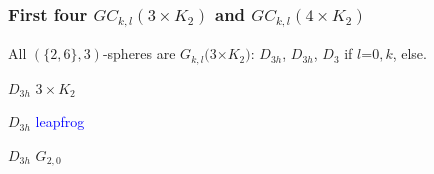 \documentclass{beamer}
\begin{document}
\begin{frame}\frametitle{First four $GC_{k,l}(3\times K_2)$ and   
$GC_{k,l}(4\times 
K_2)$}
\vspace{-2.5mm}
All $(\{2,6\},3)$-spheres are $G_{k,l}(3$$\times$$ K_2)$:  $D_{3h}$, 
$D_{3h}$, $D_3$ if $l$=$0,k$, else.
\begin{center}
\begin{minipage}[b]{25mm}
\centering
{}\par
$D_{3h}$ $3 \times K_2$
\end{minipage}
\begin{minipage}[b]{23mm}
\centering
{}\par
$D_{3h}$ \textcolor{blue}{leapfrog} 
\end{minipage}
\begin{minipage}[b]{18mm}
\centering
{}\par
$D_{3h}$  $G_{2,0}$
\end{minipage} 
\begin{minipage}[b]{28mm}

\end{minipage}
\end{center}
\end{frame}
\end{document}
